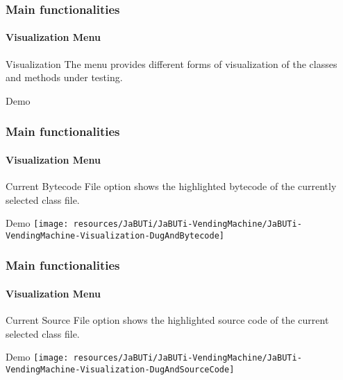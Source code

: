 \begin{frame}[parent={cmap:jabuti-gui},hasnext=true,hasprev=true]
\frametitle{Main functionalities}
\framesubtitle{Visualization Menu}
\label{concept:visualization-menu}

\begin{block}{Visualization}
The  menu provides different forms of visualization of
the classes and methods under testing.
\end{block}

\begin{block}{Demo}
\end{block}
\end{frame}



\begin{frame}
\frametitle{Main functionalities}
\framesubtitle{Visualization Menu}
\label{concept:current-bytecode-file}

\begin{block}{Current Bytecode File}
 option shows the highlighted bytecode of the
currently selected class file.
\end{block}

\begin{block}{Demo}
\texttt{[image: resources/JaBUTi/JaBUTi-VendingMachine/JaBUTi-VendingMachine-Visualization-DugAndBytecode]}
\end{block}
\end{frame}



\begin{frame}
\frametitle{Main functionalities}
\framesubtitle{Visualization Menu}
\label{concept:current-source-file}

\begin{block}{Current Source File}
 option shows the highlighted source
code of the current selected class file.
\end{block}

\begin{block}{Demo}
\texttt{[image: resources/JaBUTi/JaBUTi-VendingMachine/JaBUTi-VendingMachine-Visualization-DugAndSourceCode]}
\end{block}
\end{frame}



